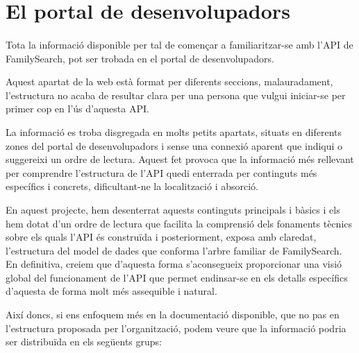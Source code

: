 \section{El portal de desenvolupadors}

    \paragraph{}
    Tota la informació disponible per tal de començar a familiaritzar-se amb l’\gls{API} de FamilySearch, pot ser trobada en el portal de desenvolupadors.

    Aquest apartat de la web està format per diferents seccions, malauradament, l’estructura no acaba de resultar clara per una persona que vulgui iniciar-se per primer cop en l'ús d'aquesta \gls{API}.

    La informació es troba disgregada en molts petits apartats, situats en diferents zones del portal de desenvolupadors i sense una connexió aparent que indiqui o suggereixi un ordre de lectura. Aquest fet provoca que la informació més rellevant per comprendre l'estructura de l'API quedi enterrada per continguts més específics i concrets, dificultant-ne la localització i absorció.

    En aquest projecte, hem desenterrat aquests continguts principals i bàsics i els hem dotat d'un ordre de lectura que facilita la comprensió dels fonaments tècnics sobre els quals l'API és construïda i posteriorment, exposa amb claredat, l'estructura del model de dades que conforma l'arbre familiar de FamilySearch. En definitiva, creiem que d'aquesta forma s'aconsegueix proporcionar una visió global del funcionament de l'API que permet endinsar-se en els detalls específics d'aquesta de forma molt més assequible i natural.

    Així doncs, si ens enfoquem més en la documentació disponible, que no pas en l'estructura proposada per l’organització, podem veure que la informació podria ser distribuïda en els següents grups:

